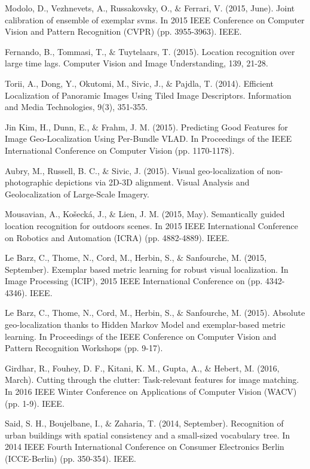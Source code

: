 \noindent
Modolo, D., Vezhnevets, A., Russakovsky, O., $\&$ Ferrari, V. (2015, June). Joint calibration of ensemble of exemplar svms. In 2015 IEEE Conference on Computer Vision and Pattern Recognition (CVPR) (pp. 3955-3963). IEEE.

\noindent
Fernando, B., Tommasi, T., $\&$ Tuytelaars, T. (2015). Location recognition over large time lags. Computer Vision and Image Understanding, 139, 21-28.

\noindent
Torii, A., Dong, Y., Okutomi, M., Sivic, J., $\&$ Pajdla, T. (2014). Efficient Localization of Panoramic Images Using Tiled Image Descriptors. Information and Media Technologies, 9(3), 351-355.


\noindent
Jin Kim, H., Dunn, E., $\&$ Frahm, J. M. (2015). Predicting Good Features for Image Geo-Localization Using Per-Bundle VLAD. In Proceedings of the IEEE International Conference on Computer Vision (pp. 1170-1178).

\noindent
Aubry, M., Russell, B. C., $\&$ Sivic, J. (2015). Visual geo-localization of non-photographic depictions via 2D-3D alignment. Visual Analysis and Geolocalization of Large-Scale Imagery.

\noindent
Mousavian, A., Košecká, J., $\&$ Lien, J. M. (2015, May). Semantically guided location recognition for outdoors scenes. In 2015 IEEE International Conference on Robotics and Automation (ICRA) (pp. 4882-4889). IEEE.


\noindent
Le Barz, C., Thome, N., Cord, M., Herbin, S., $\&$ Sanfourche, M. (2015, September). Exemplar based metric learning for robust visual localization. In Image Processing (ICIP), 2015 IEEE International Conference on (pp. 4342-4346). IEEE.


\noindent
Le Barz, C., Thome, N., Cord, M., Herbin, S., $\&$ Sanfourche, M. (2015). Absolute geo-localization thanks to Hidden Markov Model and exemplar-based metric learning. In Proceedings of the IEEE Conference on Computer Vision and Pattern Recognition Workshops (pp. 9-17).

\noindent
Girdhar, R., Fouhey, D. F., Kitani, K. M., Gupta, A., $\&$ Hebert, M. (2016, March). Cutting through the clutter: Task-relevant features for image matching. In 2016 IEEE Winter Conference on Applications of Computer Vision (WACV) (pp. 1-9). IEEE.


\noindent
Said, S. H., Boujelbane, I., $\&$ Zaharia, T. (2014, September). Recognition of urban buildings with spatial consistency and a small-sized vocabulary tree. In 2014 IEEE Fourth International Conference on Consumer Electronics Berlin (ICCE-Berlin) (pp. 350-354). IEEE.

